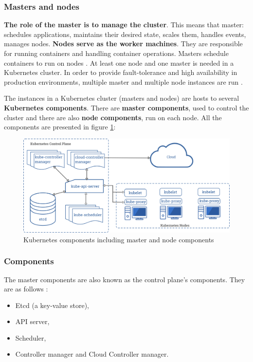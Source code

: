 \subsubsection{Masters and nodes}
\textbf{The role of the master is to manage the cluster}. This means that master: schedules applications, maintains their desired state, scales them, handles events, manages nodes. \textbf{Nodes serve as the worker machines}. They are responsible for running containers and handling container operations. Masters schedule containers to run on nodes \cite{book-mastering-k8s, k8s-cluster}. At least one node and one master is needed in a Kubernetes cluster. In order to provide fault-tolerance and high availability in production environments, multiple master and multiple node instances are run \cite{k8s-components}.

The instances in a Kubernetes cluster (masters and nodes) are hosts to several \textbf{Kubernetes components}. There are \textbf{master components}, used to control the cluster and there are also \textbf{node components}, run on each node. All the components are presented in figure \ref{fig:components-of-kubernetes}:
\begin{figure}[H]
    \centering
    \includegraphics[width=14cm]{figures/components-of-kubernetes.png}
    \caption{Kubernetes components including master and node components \cite{k8s-components}}
    \label{fig:components-of-kubernetes}
\end{figure}


\subsubsection{Components}
The master components are also known as the control plane’s components. They are as follows \cite{book-mastering-k8s, k8s-components}:
\begin{itemize}
\item Etcd (a key-value store),
\item API server,
\item Scheduler,
\item Controller manager and Cloud Controller manager.
\end{itemize}

